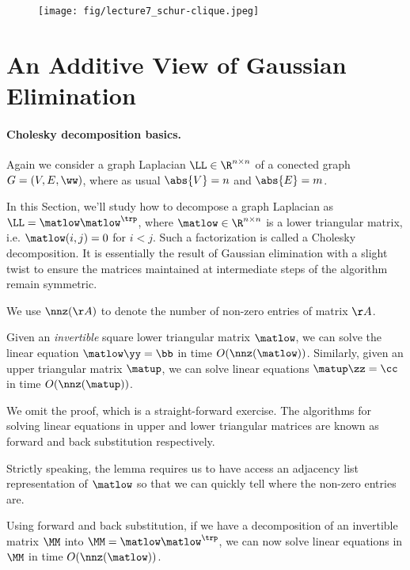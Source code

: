 \begin{figure}[h]
  \centering
  \texttt{[image: fig/lecture7\_schur-clique.jpeg]}
\label{fig:schurclique}
\end{figure}

\section{An Additive View of Gaussian Elimination}

\paragraph{Cholesky decomposition basics.}  Again we consider a graph Laplacian $\LL
\in \R^{n \times n}$ of a conected graph $G = (V,E,\ww)$, where as usual
$\abs{V} = n$ and $\abs{E} = m$.

In this Section, we'll study how to decompose a graph Laplacian as $\LL = \matlow \matlow^\trp$, where $\matlow \in \R^{n \times n}$
is a lower triangular matrix, i.e.
$\matlow(i,j) = 0$ for $i < j$.
Such a factorization is called a Cholesky
decomposition. It is essentially the result of Gaussian elimination with a slight twist
to ensure the matrices maintained at intermediate steps of the
algorithm remain symmetric.

We use $\nnz(\AA)$ to denote the number of non-zero entries of matrix $\AA$.
\begin{lemma}
Given an \emph{invertible} square lower triangular matrix $\matlow$,
we can solve the linear equation $\matlow \yy = \bb$ in time
$O(\nnz(\matlow))$.
Similarly, given an upper triangular matrix $\matup$, we can solve
linear equations $\matup \zz = \cc$ in time $O(\nnz(\matup))$.
\end{lemma}
We omit the proof, which is a straight-forward exercise.
The algorithms for solving linear equations in upper and lower
triangular matrices are known as forward and back substitution respectively.
\begin{remark}
  Strictly speaking, the lemma requires us to have access an adjacency
  list representation of $\matlow$ so that we can quickly tell where
  the non-zero entries are.
\end{remark}

Using forward and back substitution, if we have a decomposition of an
invertible matrix $\MM$ into $\MM = \matlow \matlow^\trp$, we can now
solve linear equations in $\MM$ in time $O(\nnz(\matlow))$.

